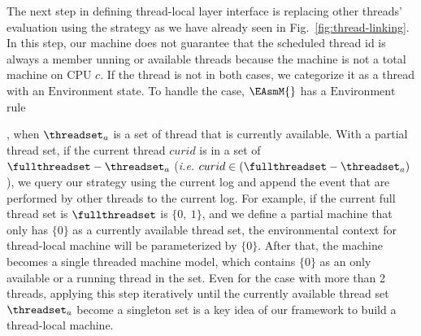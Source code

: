 The next step in defining thread-local layer interface
is replacing other threads' evaluation using the strategy as we have already seen in Fig.~\ref{fig:thread-linking}. 
In this step, our machine does not guarantee that the scheduled thread id is always a member 
unning or available threads because the machine is not a total machine on CPU $c$. 
If the thread is not in both cases, we categorize it as a thread with an $\mathrm{Environment}$ state.
To handle the case,
$\EAsmM{}$ has a $\mathrm{Environment}$ rule
\begin{small}
\begin{mathpar}
\end{mathpar}
\end{small}
, when $\threadset_a$ is a set of thread that is currently available. 
With a partial thread set, if the current thread $curid$ is in a set of $\fullthreadset - \threadset_a$ 
(\textit{i.e.} $curid \in (\fullthreadset - \threadset_a)$),
we query our strategy using the current log and append the event that are performed by other threads to the current log.
For example, if the current full thread set is $\fullthreadset$ is $\{0, \ 1 \}$,
and we define a partial machine that only has $\{0\}$ as a currently available thread set, 
the environmental context for thread-local machine will be parameterized by $\{0\}$.
After that, the machine becomes a single threaded machine model, 
which contains $\{0\}$ as an only available or a running thread in the set.  
Even for the case with more than 2 threads, applying this step iteratively until the currently available thread set $\threadset_a$ become a singleton set is a key idea of our framework to build a thread-local machine. 

